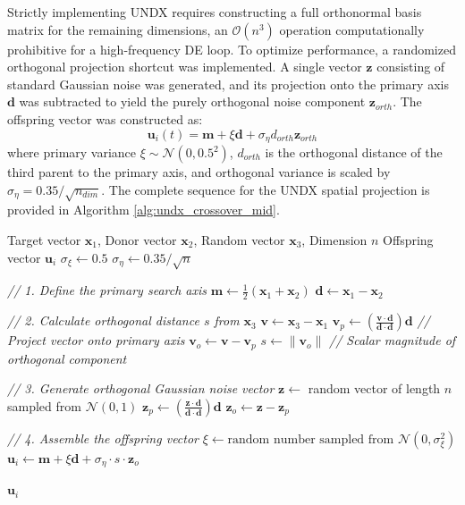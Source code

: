 \documentclass[conference]{IEEEtran}
\begin{document}
Strictly implementing UNDX requires constructing a full orthonormal basis matrix for the remaining dimensions, 
an $\mathcal{O}(n^3)$ operation computationally prohibitive for a high-frequency DE loop. To optimize performance, 
a randomized orthogonal projection shortcut was implemented. A single vector $\mathbf{z}$ consisting of standard 
Gaussian noise was generated, and its projection onto the primary axis $\mathbf{d}$ was subtracted to yield the 
purely orthogonal noise component $\mathbf{z}_{orth}$. The offspring vector was constructed as:
\begin{equation}
\mathbf{u}_i(t) = \mathbf{m} + \xi\mathbf{d} + \sigma_\eta d_{orth} \mathbf{z}_{orth}
\end{equation}
where primary variance $\xi \sim \mathcal{N}(0, 0.5^2)$, $d_{orth}$ is the orthogonal distance of the third parent to the 
primary axis, and orthogonal variance is scaled by $\sigma_\eta = 0.35 / \sqrt{n_{dim}}$.
The complete sequence for the UNDX spatial projection is provided in Algorithm \ref{alg:undx_crossover_mid}.

\begin{algorithm}[htbp]
\caption{Unimodal Normal Distribution Crossover}
\label{alg:undx_crossover_mid}
\begin{algorithmic}[1] 
\REQUIRE Target vector $\mathbf{x}_1$, Donor vector $\mathbf{x}_2$, Random vector $\mathbf{x}_3$, Dimension $n$
\ENSURE Offspring vector $\mathbf{u}_i$
\STATE $\sigma_\xi \gets 0.5$
\STATE $\sigma_\eta \gets 0.35 / \sqrt{n}$

\STATE \textit{// 1. Define the primary search axis}
\STATE $\mathbf{m} \gets \frac{1}{2}(\mathbf{x}_1 + \mathbf{x}_2)$
\STATE $\mathbf{d} \gets \mathbf{x}_1 - \mathbf{x}_2$

\STATE \textit{// 2. Calculate orthogonal distance $s$ from $\mathbf{x}_3$}
\STATE $\mathbf{v} \gets \mathbf{x}_3 - \mathbf{x}_1$
\STATE $\mathbf{v}_p \gets \left( \frac{\mathbf{v} \cdot \mathbf{d}}{\mathbf{d} \cdot \mathbf{d}} \right) \mathbf{d}$ \textit{ // Project vector onto primary axis}
\STATE $\mathbf{v}_o \gets \mathbf{v} - \mathbf{v}_p$
\STATE $s \gets \|\mathbf{v}_o\|$ \textit{ // Scalar magnitude of orthogonal component}

\STATE \textit{// 3. Generate orthogonal Gaussian noise vector}
\STATE $\mathbf{z} \gets$ random vector of length $n$ sampled from $\mathcal{N}(0, 1)$
\STATE $\mathbf{z}_p \gets \left( \frac{\mathbf{z} \cdot \mathbf{d}}{\mathbf{d} \cdot \mathbf{d}} \right) \mathbf{d}$
\STATE $\mathbf{z}_o \gets \mathbf{z} - \mathbf{z}_p$

\STATE \textit{// 4. Assemble the offspring vector}
\STATE $\xi \gets \text{random number sampled from } \mathcal{N}(0, \sigma_\xi^2)$
\STATE $\mathbf{u}_i \gets \mathbf{m} + \xi\mathbf{d} + \sigma_\eta \cdot s \cdot \mathbf{z}_o$

\RETURN $\mathbf{u}_i$
\end{algorithmic}
\end{algorithm}
\end{document}
